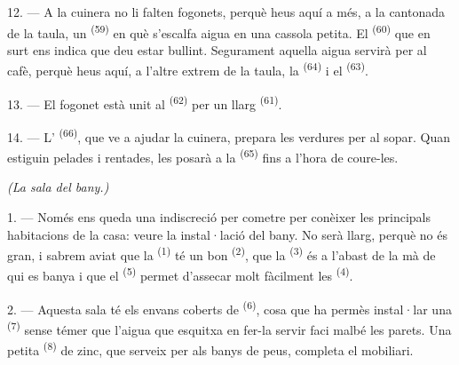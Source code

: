 12. --- A la cuinera no li falten fogonets, perquè heus aquí a més, a la
cantonada de la taula, un  \textsuperscript{(59)} en què
s'escalfa aigua en una cassola petita. El  \textsuperscript{(60)}
que en surt ens indica que deu estar bullint. Segurament aquella aigua servirà
per al cafè, perquè heus aquí, a l'altre extrem de la taula, la 
\textsuperscript{(64)} i el  \textsuperscript{(63)}.

13. --- El fogonet està unit al  \textsuperscript{(62)} per un
llarg  \textsuperscript{(61)}.

14. --- L' \textsuperscript{(66)}, que ve a ajudar la cuinera,
prepara les verdures per al sopar. Quan estiguin pelades i rentades, les posarà a
la  \textsuperscript{(65)} fins a l'hora de coure-les.

\VUsaut{4.0mm}
{\centering\fontsize{10.2pt}{10.2pt}\selectfont{} \textit{(La sala del bany.)}\par}
\VUsaut{3.0mm}

1. --- Només ens queda una indiscreció per cometre per conèixer les principals
habitacions de la casa: veure la instal·lació del bany. No serà llarg, perquè no
és gran, i sabrem aviat que la  \textsuperscript{(1)} té un bon
 \textsuperscript{(2)}, que la 
\textsuperscript{(3)} és a l'abast de la mà de qui es banya i que el
 \textsuperscript{(5)} permet d'assecar molt fàcilment les
 \textsuperscript{(4)}.

2. --- Aquesta sala té els envans coberts de 
\textsuperscript{(6)}, cosa que ha permès instal·lar una 
\textsuperscript{(7)} sense témer que l'aigua que esquitxa en fer-la servir faci
malbé les parets. Una petita  \textsuperscript{(8)} de zinc, que
serveix per als banys de peus, completa el mobiliari.
\VUsaut{6.0mm}
\VUfilet{22mm}
